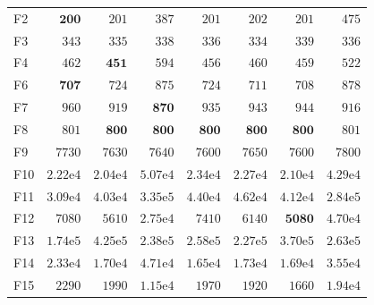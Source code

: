 \begin{tabular}{lrrrrrrr}
F2 & $\mathbf{200}$ & $201$ & $387$ & $201$ & $202$ & $201$ & $475$ \\
F3 & $343$ & $335$ & $338$ & $336$ & $334$ & $339$ & $336$ \\
F4 & $462$ & $\mathbf{451}$ & $594$ & $456$ & $460$ & $459$ & $522$ \\
F6 & $\mathbf{707}$ & $724$ & $875$ & $724$ & $711$ & $708$ & $878$ \\
F7 & $960$ & $919$ & $\mathbf{870}$ & $935$ & $943$ & $944$ & $916$ \\
F8 & $801$ & $\mathbf{800}$ & $\mathbf{800}$ & $\mathbf{800}$ & $\mathbf{800}$ & $\mathbf{800}$ & $801$ \\
F9 & $7730$ & $7630$ & $7640$ & $7600$ & $7650$ & $7600$ & $7800$ \\
F10 & $2.22\mathrm{e}{4}$ & $2.04\mathrm{e}{4}$ & $5.07\mathrm{e}{4}$ & $2.34\mathrm{e}{4}$ & $2.27\mathrm{e}{4}$ & $2.10\mathrm{e}{4}$ & $4.29\mathrm{e}{4}$ \\
F11 & $3.09\mathrm{e}{4}$ & $4.03\mathrm{e}{4}$ & $3.35\mathrm{e}{5}$ & $4.40\mathrm{e}{4}$ & $4.62\mathrm{e}{4}$ & $4.12\mathrm{e}{4}$ & $2.84\mathrm{e}{5}$ \\
F12 & $7080$ & $5610$ & $2.75\mathrm{e}{4}$ & $7410$ & $6140$ & $\mathbf{5080}$ & $4.70\mathrm{e}{4}$ \\
F13 & $1.74\mathrm{e}{5}$ & $4.25\mathrm{e}{5}$ & $2.38\mathrm{e}{5}$ & $2.58\mathrm{e}{5}$ & $2.27\mathrm{e}{5}$ & $3.70\mathrm{e}{5}$ & $2.63\mathrm{e}{5}$ \\
F14 & $2.33\mathrm{e}{4}$ & $1.70\mathrm{e}{4}$ & $4.71\mathrm{e}{4}$ & $1.65\mathrm{e}{4}$ & $1.73\mathrm{e}{4}$ & $1.69\mathrm{e}{4}$ & $3.55\mathrm{e}{4}$ \\
F15 & $2290$ & $1990$ & $1.15\mathrm{e}{4}$ & $1970$ & $1920$ & $1660$ & $1.94\mathrm{e}{4}$ \\
\bottomrule
\end{tabular}
